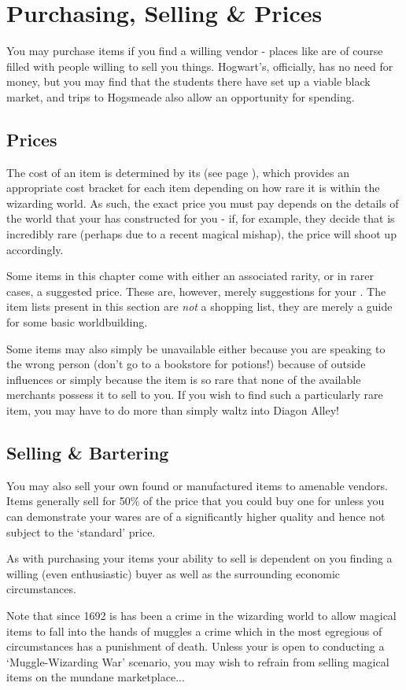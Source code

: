 \section{Purchasing, Selling \& Prices}


You may purchase items if you find a willing vendor - places like  are of course filled with people willing to sell you things. Hogwart's, officially, has no need for money, but you may find that the students there have set up a viable black market, and trips to Hogsmeade also allow an opportunity for spending. 


\subsection{Prices}

The cost of an item is determined by its (see page \pageref{S:ItemRarity}), which provides an appropriate cost bracket for each item depending on how rare it is within the wizarding world. As such, the exact price you must pay depends on the details of the world that your  has constructed for you - if, for example, they decide that  is incredibly rare (perhaps due to a recent magical mishap), the price will shoot up accordingly. 

Some items in this chapter come with either an associated rarity, or in rarer cases, a suggested price. These are, however, merely suggestions for your . The item lists present in this section are {\it not} a shopping list, they are merely a guide for some basic worldbuilding.

Some items may also simply be unavailable \minus{} either because you are speaking to the wrong person (don't go to a bookstore for potions!)\comma{} because of outside influences\comma{} or simply because the item is so rare that none of the available merchants possess it to sell to you. If you wish to find such a particularly rare item, you may have to do more than simply waltz into Diagon Alley! 

\subsection{Selling \& Bartering}

You may also sell your own found or manufactured items to amenable vendors. Items generally sell for 50\% of the price that you could buy one for\comma{} unless you can demonstrate your wares are of a significantly higher quality\comma{} and hence not subject to the `standard' price. 

As with purchasing your items\comma{} your ability to sell is dependent on you finding a willing (even enthusiastic) buyer\comma{} as well as the surrounding economic circumstances. 

Note that since 1692 is has been a crime in the wizarding world to allow magical items to fall into the hands of muggles \minus{} a crime which\comma{} in the most egregious of circumstances\comma{} has a punishment of death. Unless your  is open to conducting a `Muggle-Wizarding War' scenario, you may wish to refrain from selling magical items on the mundane marketplace...


